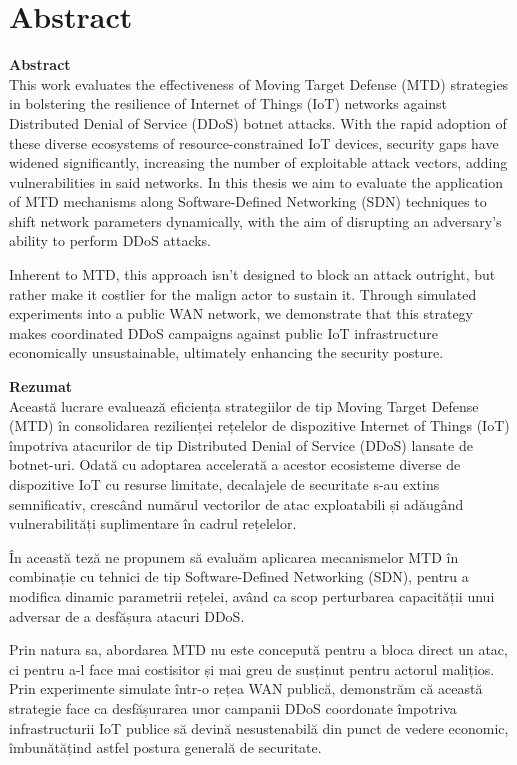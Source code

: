 \chapter*{Abstract}

\textbf{Abstract} \\[0.5em]

This work evaluates the effectiveness of Moving Target Defense (MTD) strategies in bolstering the resilience of Internet of Things (IoT) networks against Distributed Denial of Service (DDoS) botnet attacks. With the rapid adoption of these diverse ecosystems of resource-constrained IoT devices, security gaps have widened significantly, increasing the number of exploitable attack vectors, adding vulnerabilities in said networks. In this thesis we aim to evaluate the application of MTD mechanisms along Software-Defined Networking (SDN) techniques to shift network parameters dynamically, with the aim of disrupting an adversary's ability to perform DDoS attacks.

Inherent to MTD, this approach isn't designed to block an attack outright, but rather make it costlier for the malign actor to sustain it. Through simulated experiments into a public WAN network, we demonstrate that this strategy makes coordinated DDoS campaigns against public IoT infrastructure economically unsustainable, ultimately enhancing the security posture. 


\vspace{1.5em}
\textbf{Rezumat} \\[0.5em]

Această lucrare evaluează eficiența strategiilor de tip Moving Target Defense (MTD) în consolidarea rezilienței rețelelor de dispozitive Internet of Things (IoT) împotriva atacurilor de tip Distributed Denial of Service (DDoS) lansate de botnet-uri. Odată cu adoptarea accelerată a acestor ecosisteme diverse de dispozitive IoT cu resurse limitate, decalajele de securitate s-au extins semnificativ, crescând numărul vectorilor de atac exploatabili și adăugând vulnerabilități suplimentare în cadrul rețelelor.

În această teză ne propunem să evaluăm aplicarea mecanismelor MTD în combinație cu tehnici de tip Software-Defined Networking (SDN), pentru a modifica dinamic parametrii rețelei, având ca scop perturbarea capacității unui adversar de a desfășura atacuri DDoS.

Prin natura sa, abordarea MTD nu este concepută pentru a bloca direct un atac, ci pentru a-l face mai costisitor și mai greu de susținut pentru actorul malițios. Prin experimente simulate într-o rețea WAN publică, demonstrăm că această strategie face ca desfășurarea unor campanii DDoS coordonate împotriva infrastructurii IoT publice să devină nesustenabilă din punct de vedere economic, îmbunătățind astfel postura generală de securitate.